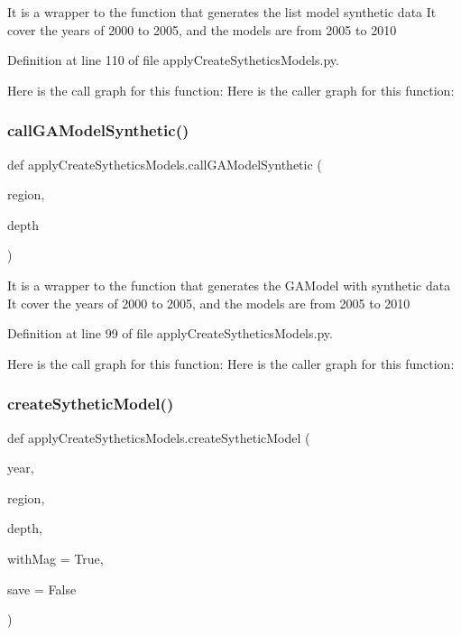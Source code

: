 \begin{DoxyVerb}It is a wrapper to the function that generates the list model synthetic data
It cover the years of 2000 to 2005, and the models are from 2005 to 2010
\end{DoxyVerb}
 

Definition at line 110 of file apply\+Create\+Sythetics\+Models.\+py.

Here is the call graph for this function\+:
Here is the caller graph for this function\+:
\mbox{\label{namespaceapply_create_sythetics_models_a2801683bfcf588f545592c33ed25e5a4}} 
\subsubsection{\texorpdfstring{call\+G\+A\+Model\+Synthetic()}{callGAModelSynthetic()}}
{\footnotesize\ttfamily def apply\+Create\+Sythetics\+Models.\+call\+G\+A\+Model\+Synthetic (\begin{DoxyParamCaption}\item[{}]{region,  }\item[{}]{depth }\end{DoxyParamCaption})}

\begin{DoxyVerb}It is a wrapper to the function that generates the GAModel with synthetic data
It cover the years of 2000 to 2005, and the models are from 2005 to 2010
\end{DoxyVerb}
 

Definition at line 99 of file apply\+Create\+Sythetics\+Models.\+py.

Here is the call graph for this function\+:
Here is the caller graph for this function\+:
\mbox{\label{namespaceapply_create_sythetics_models_ace1f4f075e61240911c118fb5d1950e3}} 
\subsubsection{\texorpdfstring{create\+Sythetic\+Model()}{createSytheticModel()}}
{\footnotesize\ttfamily def apply\+Create\+Sythetics\+Models.\+create\+Sythetic\+Model (\begin{DoxyParamCaption}\item[{}]{year,  }\item[{}]{region,  }\item[{}]{depth,  }\item[{}]{with\+Mag = {\ttfamily True},  }\item[{}]{save = {\ttfamily False} }\end{DoxyParamCaption})}

